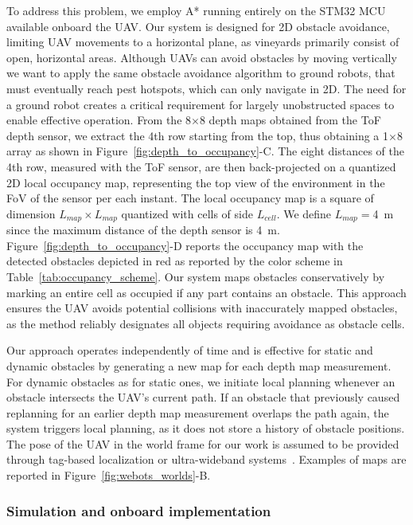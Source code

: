 To address this problem, we employ A* running entirely on the STM32 MCU available onboard the UAV. 
Our system is designed for 2D obstacle avoidance, limiting UAV movements to a horizontal plane, as vineyards primarily consist of open, horizontal areas. 
Although UAVs can avoid obstacles by moving vertically we want to apply the same obstacle avoidance algorithm to ground robots, that must eventually reach pest hotspots, which can only navigate in 2D. 
The need for a ground robot creates a critical requirement for largely unobstructed spaces to enable effective operation.
From the 8$\times$8 depth maps obtained from the ToF depth sensor, we extract the 4th row starting from the top, thus obtaining a 1$\times$8 array as shown in Figure~\ref{fig:depth_to_occupancy}-C. 
The eight distances of the 4th row, measured with the ToF sensor, are then back-projected on a quantized 2D local occupancy map, representing the top view of the environment in the FoV of the sensor per each instant.
The local occupancy map is a square of dimension $L_{map} \times L_{map}$ quantized with cells of side $L_{cell}$.
We define $L_{map}=$\SI{4}{\meter} since the maximum distance of the depth sensor is \SI{4}{\meter}.
Figure~\ref{fig:depth_to_occupancy}-D reports the occupancy map with the detected obstacles depicted in red as reported by the color scheme in Table~\ref{tab:occupancy_scheme}. 
Our system maps obstacles conservatively by marking an entire cell as occupied if any part contains an obstacle. 
This approach ensures the UAV avoids potential collisions with inaccurately mapped obstacles, as the method reliably designates all objects requiring avoidance as obstacle cells.

Our approach operates independently of time and is effective for static and dynamic obstacles by generating a new map for each depth map measurement. 
For dynamic obstacles as for static ones, we initiate local planning whenever an obstacle intersects the UAV’s current path. 
If an obstacle that previously caused replanning for an earlier depth map measurement overlaps the path again, the system triggers local planning, as it does not store a history of obstacle positions.
The pose of the UAV in the world frame for our work is assumed to be provided through tag-based localization or ultra-wideband systems~\cite{10257228}. 
Examples of maps are reported in Figure~\ref{fig:webots_worlds}-B.


\subsubsection{Simulation and onboard implementation}


